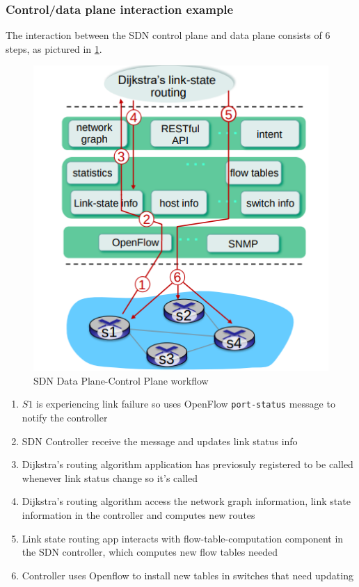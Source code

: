\documentclass[10pt,a4paper]{report}
\theoremstyle{definition}
\begin{document}
\subsubsection{Control/data plane interaction example}\label{sec:sdn-controldata-plane-interaction-example}
The interaction between the SDN control plane and data plane consists of 6 steps, as pictured in \ref{sdn-control-plane-interaction}. 
\begin{figure}[h!]
	\centering\includegraphics[scale=0.60]{images/Pasted image 20230324120358.png}
	\caption{SDN Data Plane-Control Plane workflow}
	\label{sdn-control-plane-interaction}
\end{figure}

\begin{enumerate}
	\item 
	$S1$ is experiencing link failure so uses OpenFlow \texttt{port-status} message to notify the controller
	\item 
	SDN Controller receive the message and updates link status info
	\item 
	Dijkstra's routing algorithm application has previosuly registered to be called whenever link status change so it's called
	\item 
	Dijkstra's routing algorithm access the network graph information, link state information in the controller and computes new routes
	\item 
	Link state routing app interacts with flow-table-computation component in the SDN controller, which computes new flow tables needed
	\item 
	Controller uses Openflow to install new tables in switches that need updating
\end{enumerate}
\end{document}
